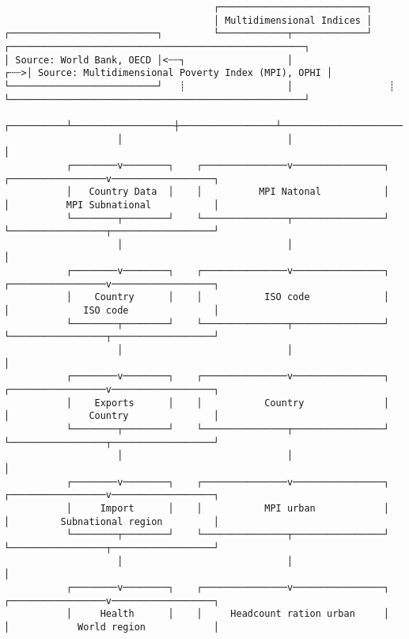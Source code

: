 \documentclass[varwidth=100em,crop]{standalone}
\begin{document}
\begin{verbatim}
                                     ┌──────────────────────────┐
                                     │ Multidimensional Indices │
┌──────────────────────────┐         └────────────┬─────────────┘       ┌────────────────────────────────────────────────────┐
│ Source: World Bank, OECD │<┄┄┐                  │                 ┌┄┄>│ Source: Multidimensional Poverty Index (MPI), OPHI │
└──────────────────────────┘   ┊                  │                 ┊   └────────────────────────────────────────────────────┘               
                    ┌──────────┴──────────────────┼─────────────────┴─────────────────────┐
                    │                             │                                       │
           ┌────────v────────┐    ┌───────────────v────────────────┐    ┌─────────────────v──────────────────┐
           │   Country Data  │    │          MPI Natonal           │    │          MPI Subnational           │
           └────────┬────────┘    └───────────────┬────────────────┘    └─────────────────┬──────────────────┘
                    │                             │                                       │
           ┌────────v────────┐    ┌───────────────v────────────────┐    ┌─────────────────v──────────────────┐
           │    Country      │    │           ISO code             │    │             ISO code               │
           └────────┬────────┘    └───────────────┬────────────────┘    └─────────────────┬──────────────────┘
                    │                             │                                       │
           ┌────────v────────┐    ┌───────────────v────────────────┐    ┌─────────────────v──────────────────┐
           │    Exports      │    │           Country              │    │              Country               │
           └────────┬────────┘    └───────────────┬────────────────┘    └─────────────────┬──────────────────┘
                    │                             │                                       │
           ┌────────v────────┐    ┌───────────────v────────────────┐    ┌─────────────────v──────────────────┐
           │     Import      │    │           MPI urban            │    │         Subnational region         │
           └────────┬────────┘    └───────────────┬────────────────┘    └─────────────────┬──────────────────┘
                    │                             │                                       │
           ┌────────v────────┐    ┌───────────────v────────────────┐    ┌─────────────────v──────────────────┐
           │     Health      │    │     Headcount ration urban     │    │            World region            │

\end{verbatim}
\end{document}
